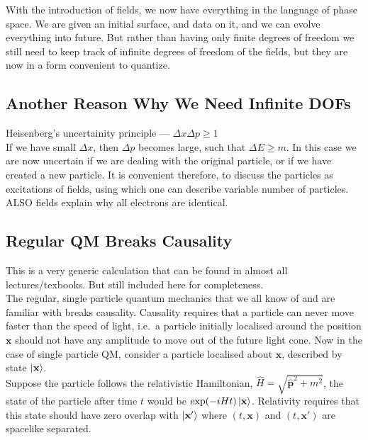 \documentclass[11pt]{article}
\numberwithin{equation}{section}
\begin{document}
    With the introduction of fields, we now have everything in the language of phase space. We are given an initial surface, and data on it, and we can evolve everything into future. But rather than having only finite degrees of freedom we still need to keep track of infinite degrees of freedom of the fields, but they are now in a form convenient to quantize.\\

    \subsection{Another Reason Why We Need Infinite DOFs}
    Heisenberg's uncertainity principle — \(\Delta x \Delta p \ge1 \)\\
    If we have small \(\Delta x\), then \(\Delta p \) becomes large, such that \(\Delta E \ge m\). In this case we are now uncertain if we are dealing with the original particle, or if we have created a new particle. It is convenient therefore, to discuss the particles as excitations of fields, using which one can describe variable number of particles.\\

    ALSO fields explain why all electrons are identical.\\

    \subsection{Regular QM Breaks Causality}
    This is a very generic calculation that can be found in almost all lectures/texbooks. But still included here for completeness. \\

    The regular, single particle quantum mechanics that we all know of and are familiar with breaks causality. Causality requires that a particle can never move faster than the speed of light, i.e.\ a particle initially localised around the position \(\textbf{x}\) should not have any amplitude to move out of the future light cone. Now in the case of single particle QM, consider a particle localised about \(\textbf{x}\), described by state \(\ket{\textbf{x}}\).\\

    Suppose the particle follows the relativistic Hamiltonian, \(\hat H = \sqrt{\hat{\textbf{p}}^2 + m^2}\), the state of the particle after time \(t\) would be \(\exp(-i H t) \ket{\textbf{x}}\). Relativity requires that this state should have zero overlap with \(\ket{\textbf{x}'}\) where \((t, \textbf{x})\) and \((t, \textbf{x}')\) are spacelike separated.\\
\end{document}
